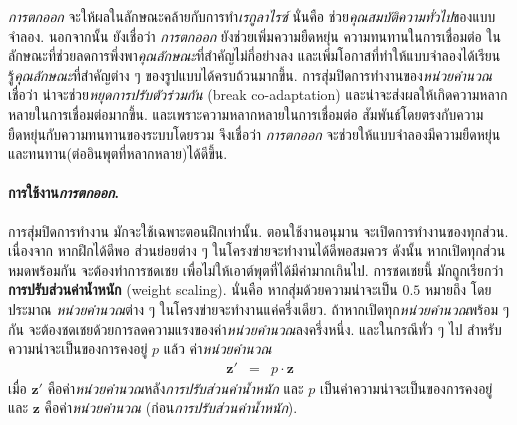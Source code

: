 \textit{การตกออก}
จะให้ผลในลักษณะคล้ายกับการทำ\textit{เรกูลาไรซ์}
นั่นคือ ช่วย\textit{คุณสมบัติความทั่วไป}ของแบบจำลอง.
นอกจากนั้น
ยังเชื่อว่า
\textit{การตกออก}
ยังช่วยเพิ่มความยืดหยุ่น ความทนทานในการเชื่อมต่อ
ในลักษณะที่ช่วยลดการพึ่งพา\textit{คุณลักษณะ}ที่สำคัญไม่กี่อย่างลง
และเพิ่มโอกาสที่ทำให้แบบจำลองได้เรียนรู้\textit{คุณลักษณะ}ที่สำคัญต่าง ๆ ของรูปแบบได้ครบถ้วนมากขึ้น.
การสุ่มปิดการทำงานของ\textit{หน่วยคำนวณ}
เชื่อว่า น่าจะช่วย\textit{หยุดการปรับตัวร่วมกัน}
(break co-adaptation)
และน่าจะส่งผลให้เกิดความหลากหลายในการเชื่อมต่อมากขึ้น.
และเพราะความหลากหลายในการเชื่อมต่อ 
สัมพันธ์โดยตรงกับความยืดหยุ่นกับความทนทานของระบบโดยรวม
จึงเชื่อว่า \textit{การตกออก} จะช่วยให้แบบจำลองมีความยืดหยุ่น
และทนทาน(ต่ออินพุตที่หลากหลาย)ได้ดีขึ้น.

\paragraph{การใช้งาน\textit{การตกออก}.}
การสุ่มปิดการทำงาน มักจะใช้เฉพาะตอนฝึกเท่านั้น.
ตอนใช้งานอนุมาน จะเปิดการทำงานของทุกส่วน.
เนื่องจาก หากฝึกได้ดีพอ ส่วนย่อยต่าง ๆ ในโครงข่ายจะทำงานได้ดีพอสมควร
ดังนั้น 
หากเปิดทุกส่วนหมดพร้อมกัน
จะต้องทำการชดเชย เพื่อไม่ให้เอาต์พุตที่ได้มีค่ามากเกินไป.
การชดเชยนี้ มักถูกเรียกว่า \textbf{การปรับส่วนค่าน้ำหนัก} (weight scaling).
นั่นคือ หากสุ่มด้วยความน่าจะเป็น $0.5$ 
หมายถึง โดยประมาณ \textit{หน่วยคำนวณ}ต่าง ๆ ในโครงข่ายจะทำงานแค่ครึ่งเดียว.
ถ้าหากเปิดทุก\textit{หน่วยคำนวณ}พร้อม ๆ กัน
จะต้องชดเชยด้วยการลดความแรงของค่า\textit{หน่วยคำนวณ}ลงครึ่งหนึ่ง.
และในกรณีทั่ว ๆ ไป สำหรับความน่าจะเป็นของการคงอยู่ $p$ แล้ว
ค่า\textit{หน่วยคำนวณ}
\begin{eqnarray}
\bm{z}' &=& p \cdot \bm{z}
\label{eq: dropout eval1}
\end{eqnarray}
เมื่อ $\bm{z}'$ คือค่า\textit{หน่วยคำนวณ}หลัง\textit{การปรับส่วนค่าน้ำหนัก}
และ $p$ เป็นค่าความน่าจะเป็นของการคงอยู่
และ $\bm{z}$ คือค่า\textit{หน่วยคำนวณ} (ก่อน\textit{การปรับส่วนค่าน้ำหนัก}).

